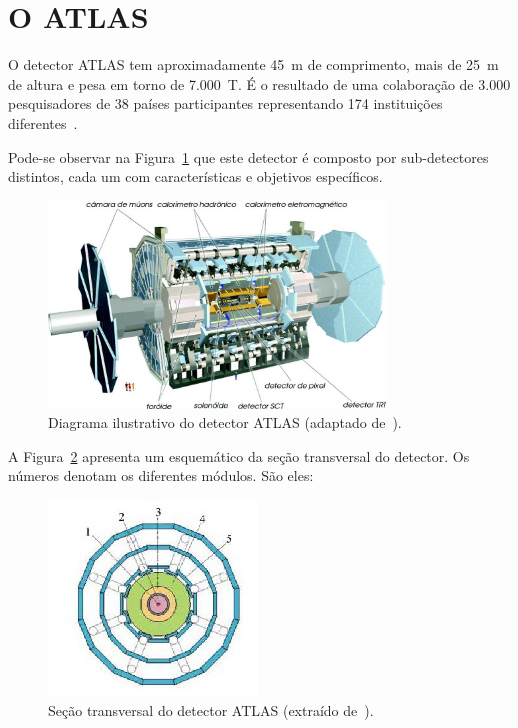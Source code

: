 \section{O ATLAS}

O detector ATLAS tem aproximadamente 45~m de comprimento, mais de 25~m de altura
e pesa em torno de 7.000~T. É o resultado de uma colaboração de 3.000
pesquisadores de 38 países participantes representando 174 instituições
diferentes~\cite{ref:atlas_factsheet}\cite{GRAEL2011}.

Pode-se observar na Figura~\ref{fig:atlasschema} que este detector é composto
por sub-detectores distintos, cada um com características e
objetivos específicos.

\begin{figure}[H]
    \centering
    \includegraphics[width=0.8\textwidth]{images/ATLAS_esquema.png}
    \caption[Diagrama ilustrativo do detector ATLAS.]{Diagrama ilustrativo do
    detector ATLAS (adaptado de~\cite{ref:atlas_www}).}
    \label{fig:atlasschema}
\end{figure}

A Figura~\ref{fig:atlassection} apresenta um esquemático da seção transversal do
detector. Os números denotam os diferentes módulos. São eles:

\begin{figure}[H]
    \centering
    \includegraphics{images/atlas_transversal.png}
    \caption[Seção transversal do detector ATLAS.]{Seção transversal do detector
    ATLAS (extraído de~\cite{ref:TORRES}).}
    \label{fig:atlassection}
\end{figure}


